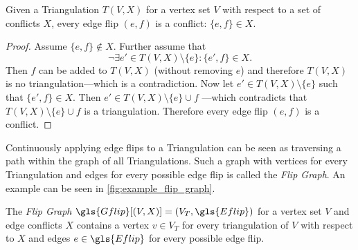 \begin{theorem}
  Given a Triangulation \(T(V,X)\) for a vertex set \(V\)
  with respect to a set of conflicts \(X\),
  every edge flip \((e,f)\) is a conflict: \(\{e,f\} \in X\).
  \begin{proof}
  Assume \(\{e,f\} \not\in X\). Further assume that
  \[ \lnot\exists e' \in T(V,X)\setminus\{e\}: \{e', f\} \in X. \]
  Then \(f\) can be added to \(T(V,X)\) (without removing \(e\)) and
  therefore \(T(V,X)\) is no triangulation---which is a 
  contradiction. Now let \(e' \in T(V,X)\setminus\{e\}\) such that
  \(\{e', f\} \in X\). Then \(e' \in T(V,X)\setminus\{e\} \cup f\)
  ---which contradicts that \(T(V,X)\setminus\{e\} \cup f\) is a
  triangulation. Therefore every edge flip \((e,f)\) is a conflict.
  \end{proof}
\end{theorem}

Continuously applying edge flips to a Triangulation can be seen as
traversing a path within the graph of all Triangulations. Such a graph
with vertices for every Triangulation and edges for every possible
edge flip is called the \emph{Flip Graph}. An example can be seen in
\cref{fig:example_flip_graph}.

\begin{definition}
  \label{def:flip_graph}
  The \emph{Flip Graph} \(\gls{Gflip}[(V,X)] = (V_T,\gls{Eflip})\)
  for a vertex set \(V\) and edge conflicts \(X\)
  contains a vertex \(v \in V_T\) for every triangulation of \(V\)
  with respect to \(X\) and edges \(e \in \gls{Eflip}\)
  for every possible edge flip.
\end{definition}

